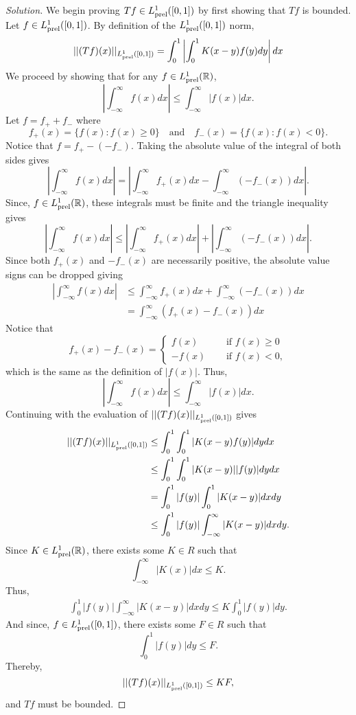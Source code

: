 \documentclass[11pt,letterpaper]{article}
\newcommand{\R}{\mathbb{R}}
\newcommand{\prel}{{\rm prel}}
\newenvironment{solution}
  {\renewcommand\qedsymbol{}\begin{proof}[Solution]}
  {\end{proof}\bigskip}
\begin{document}
\begin{solution}
 	We begin proving $Tf\in L_\prel^1([0,1])$ by first showing that $Tf$ is bounded. Let $f\in L_{\rm prel}^1([0,1])$. By definition of the $L_\prel^1([0,1])$ norm, 
 	\[\begin{split}
 		||(Tf)(x)||_{L_\prel^1([0,1])} = \int_{0}^{1}\left |\int_{0}^{1}K(x-y)f(y)dy\right |dx
 	\end{split}\]
 	We proceed by showing that for any $f\in L_\prel^1(\R)$, $$ \left |\int_{-\infty}^{\infty}f(x)dx \right | \leq \int_{-\infty}^{\infty}|f(x)|dx.$$ Let $f = f_+ + f_-$ where $$f_+(x) = \{f(x):f(x) \geq 0\} \quad \text{and} \quad f_-(x) = \{f(x):f(x) < 0\}.$$ Notice that $f = f_+ - (-f_-)$. Taking the absolute value of the integral of both sides gives $$\left |\int_{-\infty}^{\infty} f(x)dx \right | = \left |\int_{-\infty}^{\infty}f_+(x)dx - \int_{-\infty}^{\infty}(-f_-(x))dx \right |.$$ Since, $f \in  L_\prel^1(\R)$, these integrals must be finite and the triangle inequality gives $$\left |\int_{-\infty}^{\infty} f(x)dx \right | \leq \left |\int_{-\infty}^{\infty}f_+(x)dx \right | + \left | \int_{-\infty}^{\infty}(-f_-(x))dx \right |.$$ Since both $f_+(x)$ and $-f_-(x)$ are necessarily positive, the absolute value signs can be dropped giving 
 	\[\begin{split}
 		\left |\int_{-\infty}^{\infty} f(x)dx \right | &\leq \int_{-\infty}^{\infty}f_+(x)dx + \int_{-\infty}^{\infty}(-f_-(x))dx\\
 		&= \int_{-\infty}^{\infty}(f_+(x)-f_-(x))dx
 	\end{split}\]
 	Notice that 
 	\[f_+(x)-f_-(x) =
 	\begin{cases}
 		f(x) \quad &\text{ if } f(x)\geq 0\\
 		-f(x) \quad &\text{ if } f(x) <0,
 	\end{cases} \]
 	which is the same as the definition of $|f(x)|$. Thus, $$\left |\int_{-\infty}^{\infty} f(x)dx \right | \leq \int_{-\infty}^{\infty}|f(x)|dx.$$ Continuing with the evaluation of $||(Tf)(x)||_{L_\prel^1([0,1])}$ gives
 	\[\begin{split}
 		||(Tf)(x)||_{L_\prel^1([0,1])} &\leq  \int_{0}^{1} \int_{0}^{1} |K(x-y)f(y) |dydx\\
 		&\leq \int_{0}^{1} \int_{0}^{1} |K(x-y)||f(y)|dydx\\
 		&=\int_{0}^{1} |f(y)|\int_{0}^{1} |K(x-y)|dxdy\\
 		&\leq \int_{0}^{1} |f(y)|\int_{-\infty}^{\infty} |K(x-y)|dxdy.
 	\end{split}\] 
 	Since $K \in L_\prel^1(\R)$, there exists some $K \in R$ such that $$\int_{-\infty}^{\infty}|K(x)|dx \leq K.$$ Thus,
 	\[\begin{split}
 		\int_{0}^{1} |f(y)|\int_{-\infty}^{\infty} |K(x-y)|dxdy \leq K \int_{0}^{1} |f(y)|dy.
 	\end{split}\] And since, $f \in L_\prel^1([0,1])$, there exists some $F \in R$ such that $$\int_{0}^{1} |f(y)|dy \leq F.$$ Thereby, $$||(Tf)(x)||_{L_\prel^1([0,1])} \leq KF,$$ and $Tf$ must be bounded. 
 	

\end{solution}
\end{document}
